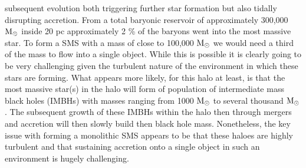 \documentclass[graphics, twocolumn, usenatbib]{mn2e}
\newcommand{\msolar} {$\rm{M_{\odot}}~$}
\newcommand{\msolarc} {$\rm{M_{\odot}}$}
\begin{document}
subsequent evolution both triggering further star formation but also tidally disrupting accretion.
From a total baryonic reservoir of approximately 300,000 \msolar inside 20 pc approximately 2 \% of the baryons went into the most massive star. To form a SMS
with a mass of close to 100,000 \msolar we would need a third of the mass to 
flow into a single object. While this is possible it is clearly going to be 
very challenging given the turbulent nature of the environment in which these stars are forming. What appears more likely, for this halo at least, is that the 
most massive star(s) in the halo will form of population of intermediate mass black holes (IMBHs) with masses ranging from 1000 \msolar to several thousand \msolarc. The subsequent growth of these IMBHs within the halo then through 
mergers and accretion will then slowly build then black hole mass. 
Nonetheless, the key issue with forming a monolithic SMS appears to be that
these haloes are highly turbulent and that sustaining accretion onto a single object in such an environment is hugely challenging. 
\end{document}
